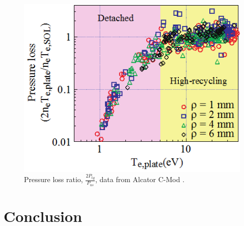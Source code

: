 \documentclass[11pt, twocolumn]{article}  %
\begin{document}
\begin{figure}
\includegraphics[scale=0.7]{Figures/PlossAlcator.png}
\centering
\caption{Pressure loss ratio, $\frac{2P_{tg}}{P_{us}}$, data from Alcator C-Mod \cite{Lipschultz2007}.}\label{fig:PlossAlcator}
\end{figure}


\section{Conclusion}\label{sec:Conclusion}




\printbibliography
\end{document}

